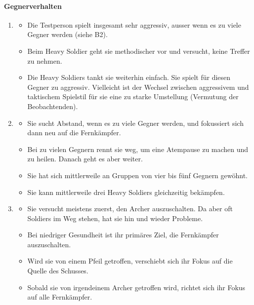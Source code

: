 \documentclass[../Main.tex]{subfiles}
\begin{document}
\paragraph{Gegnerverhalten}
\begin{enumerate}[label=\textbf{B\arabic*}, leftmargin=1.5cm, itemsep=0.8em]
\item
    \begin{itemize}[nosep]
        \item Die Testperson spielt insgesamt sehr aggressiv, ausser wenn es zu viele Gegner werden (siehe B2).
        \item Beim Heavy Soldier geht sie methodischer vor und versucht, keine Treffer zu nehmen.
        \item Die Heavy Soldiers tankt sie weiterhin einfach. Sie spielt für diesen Gegner zu aggressiv. Vielleicht ist der Wechsel zwischen aggressivem und taktischem Spielstil für sie eine zu starke Umstellung (Vermutung der Beobachtenden).
    \end{itemize}

\item
    \begin{itemize}[nosep]
        \item Sie sucht Abstand, wenn es zu viele Gegner werden, und fokussiert sich dann neu auf die Fernkämpfer.
        \item Bei zu vielen Gegnern rennt sie weg, um eine Atempause zu machen und zu heilen. Danach geht es aber weiter.
        \item Sie hat sich mittlerweile an Gruppen von vier bis fünf Gegnern gewöhnt.
        \item Sie kann mittlerweile drei Heavy Soldiers gleichzeitig bekämpfen.
    \end{itemize}

\item
    \begin{itemize}[nosep]
        \item Sie versucht meistens zuerst, den Archer auszuschalten. Da aber oft Soldiers im Weg stehen, hat sie hin und wieder Probleme.
        \item Bei niedriger Gesundheit ist ihr primäres Ziel, die Fernkämpfer auszuschalten.
        \item Wird sie von einem Pfeil getroffen, verschiebt sich ihr Fokus auf die Quelle des Schusses.
        \item Sobald sie von irgendeinem Archer getroffen wird, richtet sich ihr Fokus auf alle Fernkämpfer.
    \end{itemize}


\end{enumerate}
\end{document}
